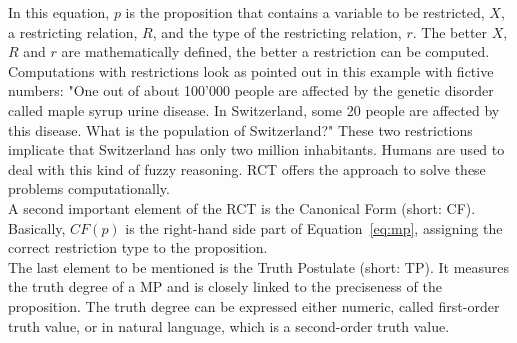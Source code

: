\documentclass[conference]{IEEEtran}
\begin{document}
In this equation, \begin{math} p \end{math} is the proposition that contains a variable to be restricted, \begin{math} X \end{math}, a restricting relation, \begin{math} R \end{math}, and the type of the restricting relation, \begin{math} r \end{math}. The better \begin{math} X \end{math}, \begin{math} R \end{math} and \begin{math} r \end{math} are mathematically defined, the better a restriction can be computed. Computations with restrictions look as pointed out in this example with fictive numbers: "One out of about 100'000 people are affected by the genetic disorder called maple syrup urine disease. In Switzerland, some 20 people are affected by this disease. What is the population of Switzerland?" These two restrictions implicate that Switzerland has only two million inhabitants. Humans are used to deal with this kind of fuzzy reasoning. RCT offers the approach to solve these problems computationally.\\
A second important element of the RCT is the Canonical Form (short: CF). Basically, \begin{math} CF(p) \end{math} is the right-hand side part of Equation~\ref{eq:mp}, assigning the correct restriction type to the proposition.\\
The last element to be mentioned is the Truth Postulate (short: TP). It measures the truth degree of a MP and is closely linked to the preciseness of the proposition. The truth degree can be expressed either numeric, called first-order truth value, or in natural language, which is a second-order truth value.
\end{document}
